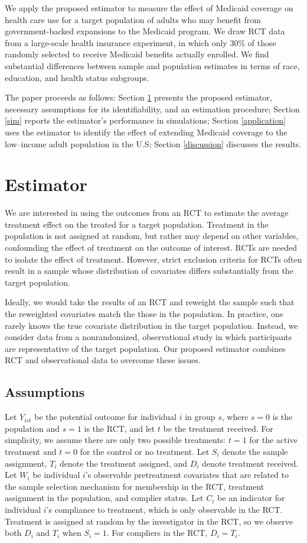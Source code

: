 \documentclass[hidelinks,12pt]{article}
\begin{document}
We apply the proposed estimator to measure the effect of Medicaid coverage on health care use for a target population of adults who may benefit from government-backed expansions to the Medicaid program. We draw RCT data from a large-scale health insurance experiment, in which only $30\%$ of those randomly selected to receive Medicaid benefits actually enrolled. We find substantial differences between sample and population estimates in terms of race, education, and health status subgroups. 

The paper proceeds as follows: Section \ref{estimator} presents the proposed estimator, necessary assumptions for its identifiability, and an estimation procedure; Section \ref{sim} reports the estimator's performance in simulations; Section \ref{application} uses the estimator to identify the effect of extending Medicaid coverage to the low--income adult population in the U.S; Section \ref{discussion} discusses the results. 

\section{Estimator} \label{estimator}
We are interested in using the outcomes from an RCT to estimate the average treatment effect on the treated for a target population. Treatment in the population is not assigned at random, but rather may depend on other variables, confounding the effect of treatment on the outcome of interest. RCTs are needed to isolate the effect of treatment. However, strict exclusion criteria for RCTs often result in a sample whose distribution of covariates differs substantially from the target population. 

Ideally, we would take the results of an RCT and reweight the sample such that the reweighted covariates match the those in the population. In practice, one rarely knows the true covariate distribution in the target population. Instead, we consider data from a nonrandomized, observational study in which participants are representative of the target population. Our proposed estimator combines RCT and observational data to overcome these issues.

\subsection{Assumptions} \label{assumptions}
Let $Y_{ist}$ be the potential outcome for individual $i$ in group $s$, where $s=0$ is the population and $s=1$ is the RCT, and let $t$ be the treatment received. For simplicity, we assume there are only two possible treatments: $t=1$ for the active treatment and $t=0$ for the control or no treatment. Let $S_i$ denote the sample assignment, $T_i$ denote the treatment assigned, and $D_i$ denote treatment received. Let $W_i$ be individual $i$'s observable pretreatment covariates that are related to the sample selection mechanism for membership in the RCT, treatment assignment in the population, and complier status. Let $C_i$ be an indicator for individual $i$'s compliance to treatment{\color{red}, which is only observable in the RCT}. Treatment is assigned at random by the investigator in the RCT, so we observe both $D_i$ and $T_i$ when $S_i = 1$. For compliers in the RCT, $D_i = T_i$.
\end{document}
